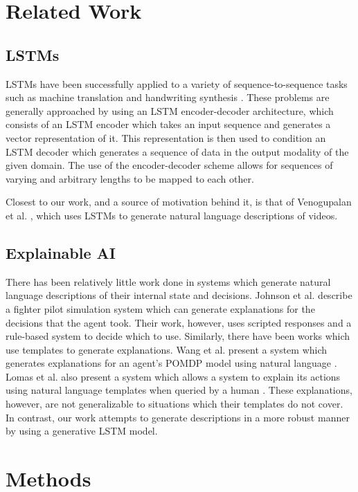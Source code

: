 \documentclass[letterpaper, 12 pt, conference]{ieeeconf}
\begin{document}
\section{Related Work}

\subsection{LSTMs}

LSTMs have been successfully applied to a variety of sequence-to-sequence tasks such as machine translation \cite{sutskever2014sequence} and handwriting synthesis \cite{graves2013generating}. These problems are generally approached by using an LSTM encoder-decoder architecture, which consists of an LSTM encoder which takes an input sequence and generates a vector representation of it. This representation is then used to condition an LSTM decoder which generates a sequence of data in the output modality of the given domain. The use of the encoder-decoder scheme allows for sequences of varying and arbitrary lengths to be mapped to each other. 

Closest to our work, and a source of motivation behind it, is that of Venogupalan et al. \cite{Venugopalan_2015_ICCV}, which uses LSTMs to generate natural language descriptions of videos.  

\subsection{Explainable AI}

There has been relatively little work done in systems which generate natural language descriptions of their internal state and decisions. Johnson et al. describe a fighter pilot simulation system which can generate explanations for the decisions that the agent took. Their work, however, uses scripted responses and a rule-based system to decide which to use. Similarly, there have been works which use templates to generate explanations. Wang et al. present a system which generates explanations for an agent's POMDP model using natural language \cite{wang2016trust}. Lomas et al. also present a system which allows a system to explain its actions using natural language templates when queried by a human \cite{lomas2012explaining}. These explanations, however, are not generalizable to situations which their templates do not cover. In contrast, our work attempts to generate descriptions in a more robust manner by using a generative LSTM model. 

\section{Methods}
\end{document}
